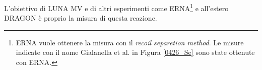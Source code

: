 \noindent L'obiettivo di LUNA MV e di altri esperimenti come ERNA\footnote{ERNA vuole ottenere la misura con il \textit{recoil separetion method}. Le misure indicate con il nome Gialanella et al. in Figura \ref{0426_Se} sono state ottenute con ERNA.} e all'estero DRAGON è proprio la misura di questa reazione.



